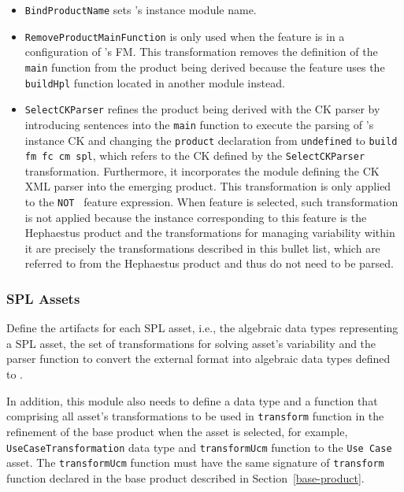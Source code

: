 \begin{itemize}
\item \texttt{BindProductName} sets \hpl{}'s instance module name. 
\item \texttt{RemoveProductMainFunction} is only used when the \hp{} feature is in a configuration of \hpl's FM. This transformation removes the definition of the \texttt{main} function from the product being derived because the \hp{} feature uses the \texttt{buildHpl} function located in another module instead.
\item \texttt{SelectCKParser} refines the product being derived with the CK parser by introducing sentences into the \texttt{main} function to execute the parsing of \hpl's instance CK and changing the \texttt{product} declaration from \texttt{undefined} to \texttt{build fm fc cm spl}, which refers to the CK defined  by the \texttt{SelectCKParser} transformation. Furthermore, it incorporates the module defining the CK XML parser into the emerging product. This transformation is only applied to the \texttt{NOT \hp{}} feature expression. When \texttt{\hp{}} feature is selected, such transformation is not applied because the instance corresponding to this feature is the Hephaestus product  and the transformations for managing variability within it are precisely the transformations described in this bullet list, which are referred to from the Hephaestus product and thus do not need to be parsed.
\end{itemize}




\subsubsection{SPL Assets} \label{spl-assets}

Define the artifacts for each SPL asset, i.e., the algebraic data types representing a SPL asset, the set of transformations for solving asset's variability and the parser function to convert the external format into algebraic data types defined to \hpl.

In addition, this module also needs to define a data type and a function that comprising all asset's transformations to be used in \texttt{transform} function in the refinement of the base product when the asset is selected, for example, \texttt{UseCaseTransformation} data type and \texttt{transformUcm} function to the \texttt{Use Case} asset. The \texttt{transformUcm} function must have the same signature of \texttt{transform} function declared in the base product described in 
Section~\ref{base-product}.




